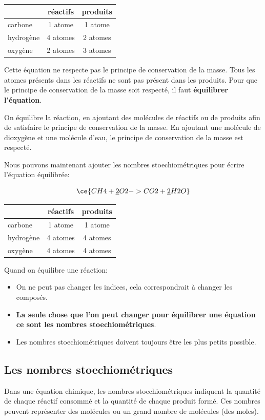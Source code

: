 \documentclass[
  11pt,
  french,
  a4paper,
  openany]{book}
\providecommand{\tightlist}{%
  \setlength{\itemsep}{0pt}\setlength{\parskip}{0pt}}
\begin{document}
\begin{longtable}[]{@{}lcc@{}}
\toprule
& réactifs & produits\tabularnewline
\midrule
\endhead
carbone & 1 atome & 1 atome\tabularnewline
hydrogène & 4 atomes & 2 atomes\tabularnewline
oxygène & 2 atomes & 3 atomes\tabularnewline
\bottomrule
\end{longtable}

Cette équation ne respecte pas le principe de conservation de la masse. Tous les atomes présents dans les réactifs ne sont pas présent dans les produits. Pour que le principe de conservation de la masse soit respecté, il faut \textbf{équilibrer l'équation}.

On équilibre la réaction, en ajoutant des molécules de réactifs ou de produits afin de satisfaire le principe de conservation de la masse. En ajoutant une molécule de dioxygène et une molécule d'eau, le principe de conservation de la masse est respecté.

Nous pouvons maintenant ajouter les nombres stoechiométriques pour écrire l'équation équilibrée:

\[ \ce{CH4 + \underline{2} O2 -> CO2 + \underline{2} H2O} \]

\begin{longtable}[]{@{}lcc@{}}
\toprule
& réactifs & produits\tabularnewline
\midrule
\endhead
carbone & 1 atome & 1 atome\tabularnewline
hydrogène & 4 atomes & 4 atomes\tabularnewline
oxygène & 4 atomes & 4 atomes\tabularnewline
\bottomrule
\end{longtable}

Quand on équilibre une réaction:

\begin{itemize}
\tightlist
\item
  On ne peut pas changer les indices, cela correspondrait à changer les composés.
\item
  \textbf{La seule chose que l'on peut changer pour équilibrer une équation ce sont les nombres stoechiométriques}.
\item
  Les nombres stoechiométriques doivent toujours être les plus petits possible.
\end{itemize}

\hypertarget{les-nombres-stoechiomuxe9triques}{%
\subsection{Les nombres stoechiométriques}\label{les-nombres-stoechiomuxe9triques}}

Dans une équation chimique, les nombres stoechiométriques indiquent la quantité de chaque réactif consommé et la quantité de chaque produit formé. Ces nombres peuvent représenter des molécules ou un grand nombre de molécules (des moles).
\end{document}

